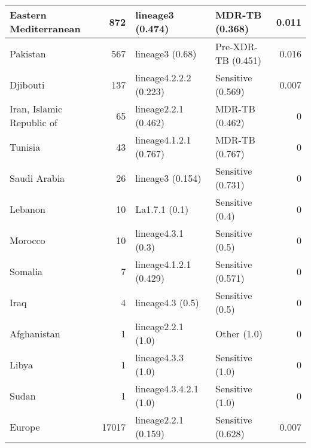 \begin{tabular}{lrllr}
 Eastern Mediterranean                        &           872 & lineage3 (0.474)         & MDR-TB (0.368)      &      0.011 \\
 \hline

 Pakistan                                     &           567 & lineage3 (0.68)          & Pre-XDR-TB (0.451)  &      0.016 \\
 Djibouti                                     &           137 & lineage4.2.2.2 (0.223)   & Sensitive (0.569)   &      0.007 \\
 Iran, Islamic Republic of                    &            65 & lineage2.2.1 (0.462)     & MDR-TB (0.462)      &      0     \\
 Tunisia                                      &            43 & lineage4.1.2.1 (0.767)   & MDR-TB (0.767)      &      0     \\
 Saudi Arabia                                 &            26 & lineage3 (0.154)         & Sensitive (0.731)   &      0     \\
 Lebanon                                      &            10 & La1.7.1 (0.1)            & Sensitive (0.4)     &      0     \\
 Morocco                                      &            10 & lineage4.3.1 (0.3)       & Sensitive (0.5)     &      0     \\
 Somalia                                      &             7 & lineage4.1.2.1 (0.429)   & Sensitive (0.571)   &      0     \\
 Iraq                                         &             4 & lineage4.3 (0.5)         & Sensitive (0.5)     &      0     \\
 Afghanistan                                  &             1 & lineage2.2.1 (1.0)       & Other (1.0)         &      0     \\
 Libya                                        &             1 & lineage4.3.3 (1.0)       & Sensitive (1.0)     &      0     \\
 Sudan                                        &             1 & lineage4.3.4.2.1 (1.0)   & Sensitive (1.0)     &      0     \\
 \hline
 
 Europe                                       &         17017 & lineage2.2.1 (0.159)     & Sensitive (0.628)   &      0.007 \\
 \hline


\end{tabular}

